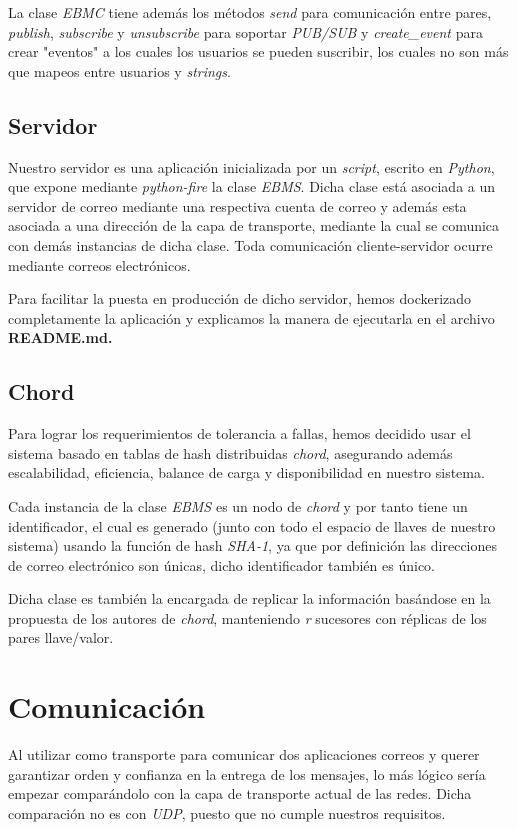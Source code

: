 \documentclass[a4paper]{article}
\begin{document}
	La clase \emph{EBMC} tiene además los métodos \emph{send} para comunicación entre pares, \emph{publish},  \emph{subscribe} y \emph{unsubscribe} para soportar \emph{PUB/SUB} y \emph{create_event} para crear "eventos" a los cuales los usuarios se pueden suscribir, los cuales no son más que mapeos entre usuarios y \emph{strings}.
	
	\subsection{Servidor}
	Nuestro servidor es una aplicación inicializada por un \emph{script}, escrito en \emph{Python}, que expone mediante \emph{python-fire} la clase \emph{EBMS}. Dicha clase está asociada a un servidor de correo mediante una respectiva cuenta de correo y además esta asociada a una dirección de la capa de transporte, mediante la cual se comunica con demás instancias de dicha clase. Toda comunicación cliente-servidor ocurre mediante correos electrónicos.
	
	Para facilitar la puesta en producción de dicho servidor, hemos dockerizado completamente la aplicación y explicamos la manera de ejecutarla en el archivo \bfseries{README.md}.
	
	
	\subsection{Chord}
	Para lograr los requerimientos de tolerancia a fallas, hemos decidido usar el sistema basado en tablas de hash distribuidas \emph{chord}, asegurando además escalabilidad, eficiencia, balance de carga y disponibilidad en nuestro sistema.
	
	Cada instancia de la clase \emph{EBMS} es un nodo de \emph{chord} y por tanto tiene un identificador, el cual es generado (junto con todo el espacio de llaves de nuestro sistema) usando la función de hash \emph{SHA-1}, ya que por definición las direcciones de correo electrónico son únicas, dicho identificador también es único.
	
	Dicha clase es también la encargada de replicar la información basándose en la propuesta de los autores de \emph{chord}, manteniendo \emph{r} sucesores con réplicas de los pares llave/valor.

\section{Comunicación}
Al utilizar como transporte para comunicar dos aplicaciones correos y querer garantizar orden y confianza en la entrega de los mensajes, lo más lógico sería empezar comparándolo con la capa de transporte actual de las redes. Dicha comparación no es con \emph{UDP}, puesto que no cumple nuestros requisitos.
\end{document}
